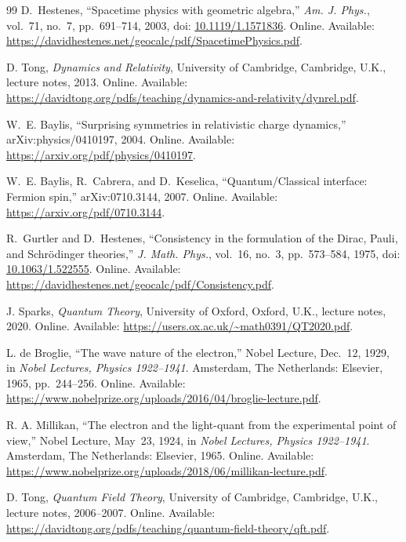 \documentclass[11pt]{article}
\numberwithin{equation}{section}
\begin{document}
\begin{thebibliography}{99}
D.~Hestenes, ``Spacetime physics with geometric algebra,''
\emph{Am. J. Phys.}, vol.~71, no.~7, pp.~691--714, 2003,
doi: \href{https://doi.org/10.1119/1.1571836}{10.1119/1.1571836}.
Online. Available: \url{https://davidhestenes.net/geocalc/pdf/SpacetimePhysics.pdf}.

D. Tong, \emph{Dynamics and Relativity}, University of Cambridge,
Cambridge, U.K., lecture notes, 2013.
Online. Available: \url{https://davidtong.org/pdfs/teaching/dynamics-and-relativity/dynrel.pdf}.

W.~E. Baylis, ``Surprising symmetries in relativistic charge dynamics,''
arXiv:physics/0410197, 2004.
Online. Available: \url{https://arxiv.org/pdf/physics/0410197}.

W.~E. Baylis, R.~Cabrera, and D.~Keselica,
``Quantum/Classical interface: Fermion spin,'' arXiv:0710.3144, 2007.
Online. Available: \url{https://arxiv.org/pdf/0710.3144}.

R.~Gurtler and D.~Hestenes,
``Consistency in the formulation of the Dirac, Pauli, and Schr\"odinger theories,''
\emph{J. Math. Phys.}, vol.~16, no.~3, pp.~573--584, 1975,
doi: \href{https://doi.org/10.1063/1.522555}{10.1063/1.522555}.
Online. Available: \url{https://davidhestenes.net/geocalc/pdf/Consistency.pdf}.

J. Sparks, \emph{Quantum Theory}, University of Oxford,
Oxford, U.K., lecture notes, 2020.
Online. Available: \url{https://users.ox.ac.uk/~math0391/QT2020.pdf}.

L. de Broglie, ``The wave nature of the electron,'' Nobel Lecture,
Dec.~12, 1929, in \emph{Nobel Lectures, Physics 1922--1941}.
Amsterdam, The Netherlands: Elsevier, 1965, pp.~244--256.
Online. Available: \url{https://www.nobelprize.org/uploads/2016/04/broglie-lecture.pdf}.

R. A. Millikan, ``The electron and the light-quant from the experimental
point of view,'' Nobel Lecture, May~23, 1924,
in \emph{Nobel Lectures, Physics 1922--1941}.
Amsterdam, The Netherlands: Elsevier, 1965.
Online. Available: \url{https://www.nobelprize.org/uploads/2018/06/millikan-lecture.pdf}.

D. Tong, \emph{Quantum Field Theory}, University of Cambridge,
Cambridge, U.K., lecture notes, 2006--2007.
Online. Available: \url{https://davidtong.org/pdfs/teaching/quantum-field-theory/qft.pdf}.


\end{thebibliography}
\end{document}
